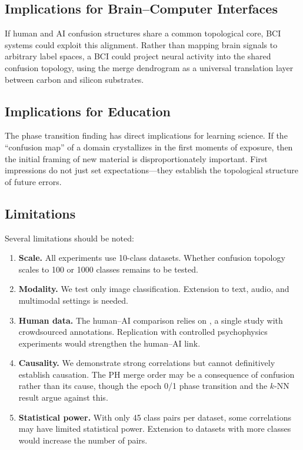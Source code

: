 \documentclass[11pt,a4paper]{article}
\begin{document}
\subsection{Implications for Brain--Computer Interfaces}

If human and AI confusion structures share a common topological core, BCI systems could exploit this alignment. Rather than mapping brain signals to arbitrary label spaces, a BCI could project neural activity into the shared confusion topology, using the merge dendrogram as a universal translation layer between carbon and silicon substrates.

\subsection{Implications for Education}

The phase transition finding has direct implications for learning science. If the ``confusion map'' of a domain crystallizes in the first moments of exposure, then the initial framing of new material is disproportionately important. First impressions do not just set expectations---they establish the topological structure of future errors.

\subsection{Limitations}

Several limitations should be noted:

\begin{enumerate}
  \item \textbf{Scale.} All experiments use 10-class datasets. Whether confusion topology scales to 100 or 1000 classes remains to be tested.

  \item \textbf{Modality.} We test only image classification. Extension to text, audio, and multimodal settings is needed.

  \item \textbf{Human data.} The human--AI comparison relies on \citet{peterson2019}, a single study with crowdsourced annotations. Replication with controlled psychophysics experiments would strengthen the human--AI link.

  \item \textbf{Causality.} We demonstrate strong correlations but cannot definitively establish causation. The PH merge order may be a consequence of confusion rather than its cause, though the epoch 0/1 phase transition and the $k$-NN result argue against this.

  \item \textbf{Statistical power.} With only 45 class pairs per dataset, some correlations may have limited statistical power. Extension to datasets with more classes would increase the number of pairs.
\end{enumerate}
\end{document}
